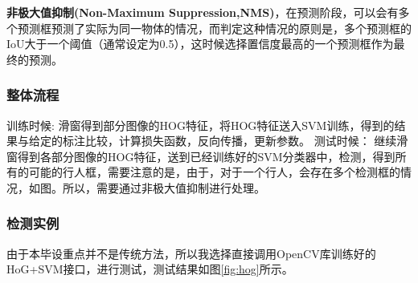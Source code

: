 \documentclass[12pt,a4paper,titlepage]{article}
\begin{document}
\textbf{非极大值抑制(Non-Maximum Suppression,NMS)}，在预测阶段，可以会有多个预测框预测了实际为同一物体的情况，而判定这种情况的原则是，多个预测框的IoU大于一个阈值（通常设定为0.5），这时候选择置信度最高的一个预测框作为最终的预测。
\subsubsection{整体流程}
训练时候:
滑窗得到部分图像的HOG特征，将HOG特征送入SVM训练，得到的结果与给定的标注比较，计算损失函数，反向传播，更新参数。
测试时候：
继续滑窗得到各部分图像的HOG特征，送到已经训练好的SVM分类器中，检测，得到所有的可能的行人框，需要注意的是，由于，对于一个行人，会存在多个检测框的情况，如图。所以，需要通过非极大值抑制进行处理。
\subsubsection{检测实例}
由于本毕设重点并不是传统方法，所以我选择直接调用OpenCV库训练好的HoG+SVM接口，进行测试，测试结果如图\ref{fig:hog}所示。
\end{document}
